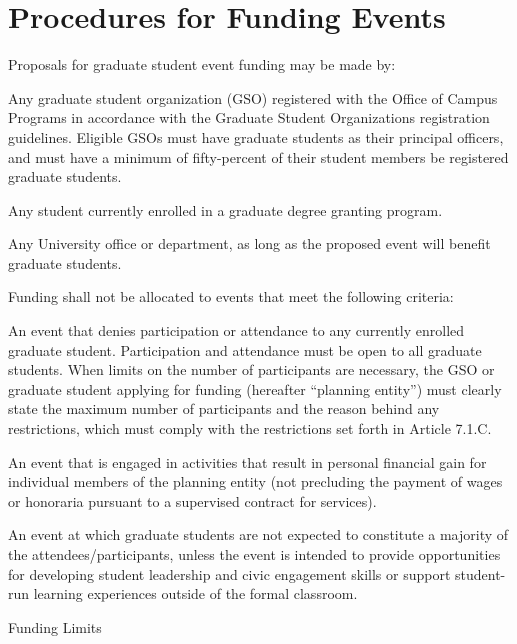 \section{Procedures for Funding Events}
\begin{bylaws-number}
  \item Proposals for graduate student event funding may be made by:
\begin{bylaws-number}
  \item Any graduate student organization (GSO) registered with the Office of Campus Programs in accordance with the Graduate Student Organizations registration guidelines. Eligible GSOs must have graduate students as their principal officers, and must have a minimum of fifty-percent of their student members be registered graduate students.
  \item Any student currently enrolled in a graduate degree granting program.
  \item Any University office or department, as long as the proposed event will benefit graduate students.
\end{bylaws-number}
  \item Funding shall not be allocated to events that meet the following criteria:
\begin{bylaws-number} 
  \item An event that denies participation or attendance to any currently enrolled graduate student. Participation and attendance must be open to all graduate students. When limits on the number of participants are necessary, the GSO or graduate student applying for funding (hereafter “planning entity”) must clearly state the maximum number of participants and the reason behind any restrictions, which must comply with the restrictions set forth in Article 7.1.C.
  \item An event that is engaged in activities that result in personal financial gain for individual members of the planning entity (not precluding the payment of wages or honoraria pursuant to a supervised contract for services).
  \item An event at which graduate students are not expected to constitute a majority of the attendees/participants, unless the event is intended to provide opportunities for developing student leadership and civic engagement skills or support student-run learning experiences outside of the formal classroom.
\end{bylaws-number}
  \item Funding Limits
\begin{bylaws-number}

\end{bylaws-number}
\end{bylaws-number}
